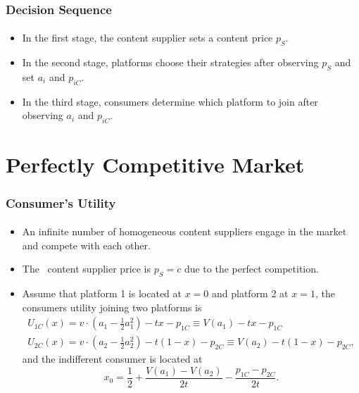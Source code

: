 \documentclass{beamer}
\newcommand{\hl}[1]{\textcolor{myblue}{#1}}
\newcommand{\eq}{\text{equilibrium}}
\begin{document}
\begin{frame}%
    \frametitle{Decision Sequence}
    \framesubtitle{}
    \begin{itemize}
        \item In the \hl{first stage}, \hl{the content supplier} sets a content price $p_S$.
        \item In the \textcolor{myred}{second stage}, 
            \textcolor{myred}{platforms} choose their strategies after observing
            $p_S$ and set $a_i$ and $p_{iC}$.
        \item In the \textcolor{myyellow}{third stage}, 
            \textcolor{myyellow}{consumers} determine which platform to join after 
            observing $a_i$ and $p_{iC}$.
    \end{itemize}
\end{frame}

\section{Perfectly Competitive Market}
\begin{frame}%
    \frametitle{Consumer's Utility}
    \framesubtitle{}
    \begin{itemize}
        \item An infinite number of homogeneous content suppliers
            engage in the market and compete with each other.
        \item The \eq\ content supplier price is $p_S=c$ due to the 
            perfect competition.
        \item Assume that platform 1 is located at $x=0$ and platform 2
            at $x=1$, the consumers utility joining two platforms is
            \[
                \begin{array}{L}
                    U_{1C}(x)=v\cdot\left(a_1-\frac{1}{2}a_1^2\right)
                    -tx-p_{1C}\equiv V(a_1)-tx-p_{1C} \\
                    U_{2C}(x)=v\cdot\left(a_2-\frac{1}{2}a_2^2\right)
                    -t(1-x)-p_{2C}\equiv V(a_2)-t(1-x)-p_{2C},
                \end{array}
            \]
            and the indifferent consumer is located at
            \[
                x_0=\frac{1}{2}+\frac{V(a_1)-V(a_2)}{2t}-\frac{p_{1C}-p_{2C}}{2t}.
            \]
    \end{itemize}
\end{frame}
\end{document}
